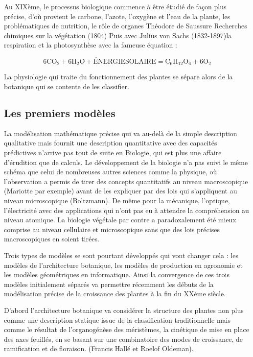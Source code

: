 Au XIXème, le processus biologique commence à être étudié de façon plus précise, d’où provient le carbone, l’azote, l’oxygène et l’eau de la plante, les problématiques de nutrition, le rôle de organes   Théodore de Saussure Recherches chimiques sur la végétation (1804) Puis avec Julius von Sachs   (1832-1897)la respiration et la photosynthèse avec la fameuse équation :

\[6 \mathrm{CO_2} + 6 \mathrm{H_2O} + \mathrm{ÉNERGIE SOLAIRE} = \mathrm{C_6H_12O_6} + 6 \mathrm{O_2} \]

La physiologie qui traite du fonctionnement des plantes se sépare alors de la botanique qui se contente de les classifier.

\subsection{Les premiers modèles}

La modélisation mathématique précise qui va au-delà de la simple description qualitative mais fournit une description quantitative avec des capacités prédictives n’arrive pas tout de suite en Biologie, qui est plus une affaire d’érudition que de calculs. Le développement de la biologie n’a pas suivi le même schéma que celui de nombreuses autres sciences comme la physique, où l’observation a permis de tirer des concepts quantitatifs au niveau macroscopique (Mariotte par exemple) avant de les expliquer par des lois qui s’appliquent au niveau microscopique (Boltzmann). De même pour la mécanique, l’optique, l’électricité avec des applications qui n’ont pas eu à attendre la compréhension au niveau atomique. La biologie végétale par contre a paradoxalement été mieux comprise au niveau cellulaire et microscopique sans que des lois précises macroscopiques en soient tirées.

Trois types de modèles se sont pourtant développés qui vont changer cela : les modèles de l’architecture botanique, les modèles de production en agronomie et les modèles géométriques en informatique. Ainsi la convergence de ces trois modèles initialement séparés va permettre récemment les débuts de la modélisation précise de la croissance des plantes à la fin du XXème siècle.  

D’abord l’architecture botanique va considérer la structure des plantes non plus comme une description statique issue de la classification traditionnelle mais comme le résultat de l’organogénèse des méristèmes, la cinétique de mise en place des axes feuillés, en se basant sur une combinatoire des modes de croissance, de ramification et de floraison. (Francis Hallé et Roelof Oldeman).

